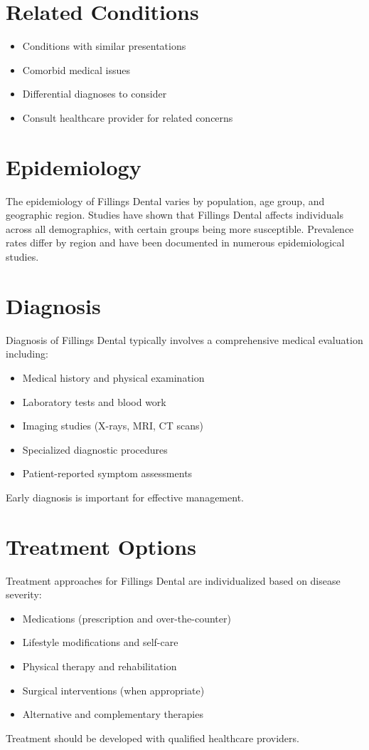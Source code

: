 \section*{Related Conditions}
\begin{itemize}
  \item Conditions with similar presentations
  \item Comorbid medical issues
  \item Differential diagnoses to consider
  \item Consult healthcare provider for related concerns
\end{itemize}

\section*{Epidemiology}
The epidemiology of Fillings Dental varies by population, age group, and geographic region. Studies have shown that Fillings Dental affects individuals across all demographics, with certain groups being more susceptible. Prevalence rates differ by region and have been documented in numerous epidemiological studies.

\section*{Diagnosis}
Diagnosis of Fillings Dental typically involves a comprehensive medical evaluation including:
\begin{itemize}
  \item Medical history and physical examination
  \item Laboratory tests and blood work
  \item Imaging studies (X-rays, MRI, CT scans)
  \item Specialized diagnostic procedures
  \item Patient-reported symptom assessments
\end{itemize}
Early diagnosis is important for effective management.

\section*{Treatment Options}
Treatment approaches for Fillings Dental are individualized based on disease severity:
\begin{itemize}
  \item Medications (prescription and over-the-counter)
  \item Lifestyle modifications and self-care
  \item Physical therapy and rehabilitation
  \item Surgical interventions (when appropriate)
  \item Alternative and complementary therapies
\end{itemize}
Treatment should be developed with qualified healthcare providers.

